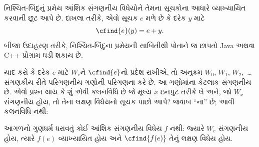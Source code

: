 \documentclass[../../../include/open-logic-section]{subfiles}
\begin{document}

નિશ્ચિત-બિંદુનું પ્રમેય આંશિક સંગણનીય વિધેયોને તેમના
સૂચકોના આધારે વ્યાખ્યાયિત કરવાની છૂટ આપે છે. દાખલા
તરીકે, એવો સૂચક $e$ મળે છે કે દરેક $y$ માટે
\[
\cfind{e}(y) = e + y.
\]
બીજા ઉદાહરણ તરીકે, નિશ્ચિત-બિંદુના પ્રમેયની સાબિતીથી
પોતાને જ છાપતો Java અથવા C++ પ્રોગ્રામ ઘડી શકાય છે.

યાદ કરો કે દરેક $e$ માટે $W_e$ને $\cfind{e}$નો પ્રદેશ
રાખીએ, તો અનુક્રમ $W_0$, $W_1$, $W_2$,~\dots સંગણકીય
રીતે પરિગણનીય ગણોની પરિગણના કરે છે. આ ગણોમાંના કેટલાક
સંગણનીય છે. એવો પ્રશ્ન થાય કે શું એવી કલનવિધિ છે જે
મૂલ્ય $x$ ઇનપુટ તરીકે લે અને, જો $W_x$ સંગણનીય હોય,
તો તેના લક્ષણ વિધેયનો સૂચક પાછો આપે? જવાબ ``ના'' છે;
આવી કલનવિધિ નથી:

\begin{thm}
આગળનો ગુણધર્મ ધરાવતું કોઈ આંશિક સંગણનીય વિધેય $f$
નથી: જ્યારે $W_e$ સંગણનીય હોય, ત્યારે $f(e)$
વ્યાખ્યાયિત હોય અને $\cfind{f(e)}$ તેનું લક્ષણ વિધેય હોય.
\end{thm}
\end{document}
